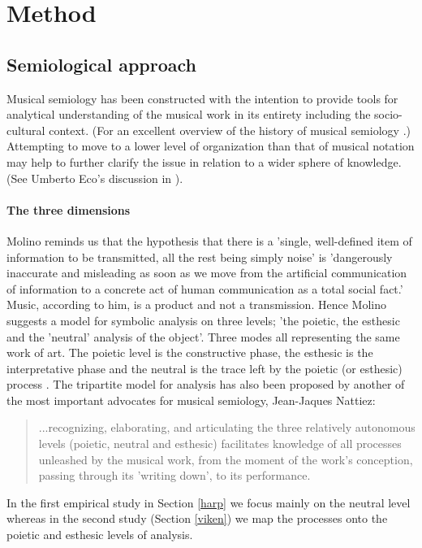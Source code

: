 \documentclass[10pt,letterpaper]{article}
\begin{document}
\section{Method}
\subsection{Semiological approach}
Musical semiology has been constructed with the intention to provide
tools for analytical understanding of the musical work in its entirety
including the socio-cultural context. (For an excellent overview of the history of musical semiology \cite{nat89}.)
Attempting to move to a lower level of organization than that of musical notation may help to
further clarify the issue in relation to a wider sphere of
knowledge. (See Umberto Eco's discussion in \cite[pp.372]{eco71}).

\paragraph{The three dimensions} \label{threedim}

Molino reminds us that the hypothesis that there is a 'single,
well-defined item of information to be transmitted, all the rest being
simply noise' is 'dangerously inaccurate and misleading as soon as we
move from the artificial communication of information to a concrete act
of human communication as a total social fact.' Music, according to him,
is a product and not a transmission. Hence Molino suggests a model for
symbolic analysis on three levels; 'the poietic, the esthesic and the
'neutral' analysis of the object'. Three modes all representing the same
work of art. The poietic level is the constructive phase, the esthesic
is the interpretative phase and the neutral is the trace left by the
poietic (or esthesic) process \cite{molino}\nocite{molino2}. The
tripartite model for analysis has also been proposed by another of the most
important advocates for musical semiology, Jean-Jaques Nattiez:
\begin{quote}
...recognizing, elaborating, and articulating the three relatively
autonomous levels (poietic, neutral and esthesic) facilitates knowledge
of all processes unleashed by the musical work, from the moment of the
work's conception, passing through its 'writing down', to its
performance. \cite{nattiez}
\end{quote}
In the first empirical study in Section \ref{harp} we focus mainly on
the neutral level whereas in the second study (Section \ref{viken}) we
map the processes onto the poietic and esthesic levels of analysis.
\end{document}
